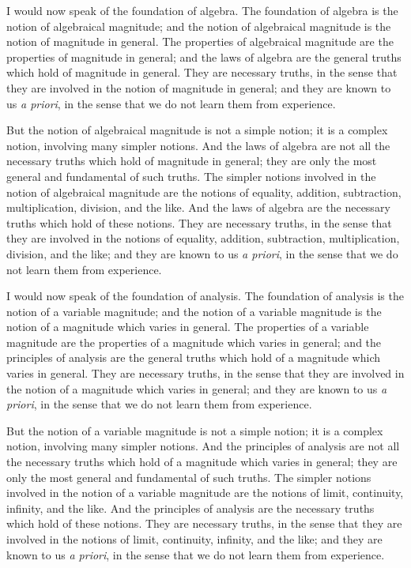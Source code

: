 \documentclass[11pt,a4paper]{article}
\begin{document}
I would now speak of the foundation of algebra. The foundation of
algebra is the notion of algebraical magnitude; and the notion of
algebraical magnitude is the notion of magnitude in general. The
properties of algebraical magnitude are the properties of magnitude in
general; and the laws of algebra are the general truths which hold of
magnitude in general. They are necessary truths, in the sense that they
are involved in the notion of magnitude in general; and they are known
to us \textit{a priori}, in the sense that we do not learn them from
experience.

But the notion of algebraical magnitude is not a simple notion; it is a
complex notion, involving many simpler notions. And the laws of algebra
are not all the necessary truths which hold of magnitude in general;
they are only the most general and fundamental of such truths. The
simpler notions involved in the notion of algebraical magnitude are the
notions of equality, addition, subtraction, multiplication, division,
and the like. And the laws of algebra are the necessary truths which
hold of these notions. They are necessary truths, in the sense that
they are involved in the notions of equality, addition, subtraction,
multiplication, division, and the like; and they are known to us
\textit{a priori}, in the sense that we do not learn them from
experience.

I would now speak of the foundation of analysis. The foundation of
analysis is the notion of a variable magnitude; and the notion of a
variable magnitude is the notion of a magnitude which varies in general.
The properties of a variable magnitude are the properties of a magnitude
which varies in general; and the principles of analysis are the general
truths which hold of a magnitude which varies in general. They are
necessary truths, in the sense that they are involved in the notion of a
magnitude which varies in general; and they are known to us
\textit{a priori}, in the sense that we do not learn them from
experience.

But the notion of a variable magnitude is not a simple notion; it is a
complex notion, involving many simpler notions. And the principles of
analysis are not all the necessary truths which hold of a magnitude
which varies in general; they are only the most general and fundamental
of such truths. The simpler notions involved in the notion of a
variable magnitude are the notions of limit, continuity, infinity, and
the like. And the principles of analysis are the necessary truths which
hold of these notions. They are necessary truths, in the sense that
they are involved in the notions of limit, continuity, infinity, and the
like; and they are known to us \textit{a priori}, in the sense that we
do not learn them from experience.
\end{document}

